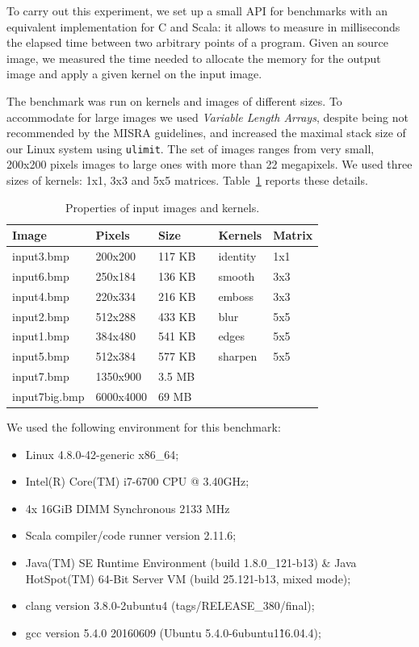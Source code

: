 \documentclass[a4paper,twoside]{article}
\newcommand{\Inline}[1]{\lstinline[basicstyle=\ttfamily]|#1|}
\newcommand{\RefTable}[1]{Table~\ref{#1}}
\begin{document}
To carry out this experiment, we set up a small API for benchmarks with an equivalent
implementation for C and Scala: it allows to measure in milliseconds the elapsed
time between two arbitrary points of a program. Given an source image, we
measured the time needed to allocate the memory for the output image and apply a
given kernel on the input image.

The benchmark was run on kernels and images of different sizes. To accommodate
for large images we used \emph{Variable Length Arrays}, despite being not
recommended by the MISRA guidelines, and increased the maximal stack size of our
Linux system using \Inline{ulimit}. The set of images ranges from very small,
200x200 pixels images to large ones with more than 22 megapixels. We used three
sizes of kernels: 1x1, 3x3 and 5x5 matrices. \RefTable{tab:improc_params}
reports these details.


\begin{table}[h]
\centering
\caption{Properties of input images and kernels.}
\label{tab:improc_params}
\begin{tabular}{@{}lll|l|ll@{}}
\toprule
Image         & Pixels    & Size   &  & Kernels  & Matrix \\ \midrule
input3.bmp    & 200x200   & 117 KB &  & identity & 1x1    \\
input6.bmp    & 250x184   & 136 KB &  & smooth   & 3x3    \\
input4.bmp    & 220x334   & 216 KB &  & emboss   & 3x3    \\
input2.bmp    & 512x288   & 433 KB &  & blur     & 5x5    \\
input1.bmp    & 384x480   & 541 KB &  & edges    & 5x5    \\
input5.bmp    & 512x384   & 577 KB &  & sharpen  & 5x5    \\
input7.bmp    & 1350x900  & 3.5 MB &  &          &        \\
input7big.bmp & 6000x4000 & 69 MB  &  &          &        \\ \bottomrule
\end{tabular}
\end{table}

\pagebreak
We used the following environment for this benchmark:
\begin{itemize}
\item Linux 4.8.0-42-generic x86\_64;
\item Intel(R) Core(TM) i7-6700 CPU @ 3.40GHz;
\item 4x 16GiB DIMM Synchronous 2133 MHz
\item Scala compiler/code runner version 2.11.6;
\item Java(TM) SE Runtime Environment (build 1.8.0\_121-b13) \&
      Java HotSpot(TM) 64-Bit Server VM (build 25.121-b13, mixed mode);
\item clang version 3.8.0-2ubuntu4 (tags/RELEASE\_380/final);
\item gcc version 5.4.0 20160609 (Ubuntu 5.4.0-6ubuntu1\~16.04.4);
\end{itemize}
\end{document}
